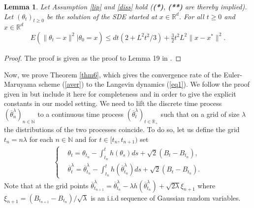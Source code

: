 \documentclass[a4paper]{article}
\newtheorem{lemma}[theorem]{Lemma}
\def\Rd{\mathbb{R}^d}
\def\tlb{\overline{\theta}^{\lambda}}
\def\t{{\theta}}
\begin{document}
\begin{lemma}\label{lem5}
	Let Assumption \ref{lip} and \ref{diss} hold ({\bf (*)}, {\bf (**)} are thereby implied). Let $(\t_t)_{t \geq 0}$ be the solution of the SDE started at $x \in \Rd$. For all $t \geq 0$ and $x \in \Rd$
	\begin{align*}
	E\left(\|\t_t-x\|^2 | \t_0=x \right) \leq dt(2+L^2t^2/3)+\tfrac{3}{2}t^2L^2 \|x-x^*\|^2.
	\end{align*}
\end{lemma}

\begin{proof}
	The proof is given as the proof to Lemma 19 in \cite{durmus-moulines}.
\end{proof}

Now, we prove Theorem \ref{thm6}, which gives the convergence rate of the Euler-Maruyama scheme (\ref{aver}) to the Langevin dynamics (\ref{eq1}). We follow the proof given in \cite{durmus-moulines} but include it here for completeness and in order to give the explicit constants in our model setting. We need to lift the discrete time process $(\overline{\theta}^{\lambda}_n)_{n \in \mathbb{N}}$ to a continuous time process $(\overline{\theta}^{\lambda}_t)_{t \in \mathbb{R}_+}$ such that on a grid of size $\lambda$ the distributions of the two processes coincide. To do so, let us define the grid $t_n = n \lambda$ for each $n \in \mathbb{N}$ and for $t \in [t_n, t_{n+1})$ set
\begin{align}\label{coupling}
\begin{cases}
&\t_t=\t_{t_n}-\int_{t_n}^th(\t_s)ds+\sqrt{2}(B_t-B_{t_n}), \\
& \tlb_t=\tlb_{t_n}-\int_{t_n}^t h(\tlb_{t_n})ds+\sqrt{2}(B_t-B_{t_n}).
\end{cases}
\end{align}
Note that at the grid points $\overline{\theta}^{\lambda}_{t_{n+1}} = \overline{\theta}^{\lambda}_{t_n} - \lambda h(\overline{\theta}^{\lambda}_{t_n}) + \sqrt{2\lambda} \xi_{n+1} $ where $\xi_{n+1} = (B_{t_{n+1}} - B_{t_n})/\sqrt{\lambda}$ is an i.i.d sequence of Gaussian random variables.
\end{document}
